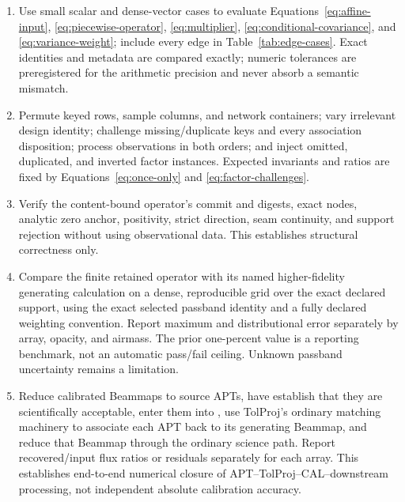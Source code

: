 \begin{enumerate}[label=\textbf{V\arabic*.},leftmargin=*]
\item {} Use small scalar and dense-vector
  cases to evaluate Equations~\eqref{eq:affine-input},
  \eqref{eq:piecewise-operator}, \eqref{eq:multiplier},
  \eqref{eq:conditional-covariance}, and \eqref{eq:variance-weight}; include
  every edge in Table~\ref{tab:edge-cases}. Exact identities and metadata are
  compared exactly; numeric tolerances are preregistered for the arithmetic
  precision and never absorb a semantic mismatch.

\item {} Permute keyed rows,
  sample columns, and network containers; vary irrelevant design identity;
  challenge missing/duplicate keys and every association disposition; process
  observations in both orders; and inject omitted, duplicated, and inverted
  factor instances. Expected invariants and ratios are fixed by
  Equations~\eqref{eq:once-only} and \eqref{eq:factor-challenges}.

\item {} Verify the content-bound
  operator's commit and digests, exact nodes, analytic zero
  anchor, positivity, strict direction, seam continuity, and support rejection
  without using observational data. This establishes structural correctness
  only.

\item {} Compare the finite retained
  operator with its named higher-fidelity generating calculation on a dense,
  reproducible grid over the exact declared support, using the exact selected
  passband identity and a fully declared weighting convention. Report maximum
  and distributional error separately by array, opacity, and airmass. The
  prior one-percent value is a reporting benchmark, not an automatic
  pass/fail ceiling. Unknown passband uncertainty remains a limitation.

\item {} Reduce calibrated Beammaps to source APTs,
  have  establish that they are scientifically acceptable,
  enter them into , use TolProj's ordinary matching machinery
  to associate each APT back to its generating Beammap, and reduce that Beammap
  through the ordinary science path. Report recovered/input flux ratios or
  residuals separately for each array. This establishes end-to-end numerical
  closure of APT--TolProj--CAL--downstream processing, not independent absolute
  calibration accuracy.


\end{enumerate}
